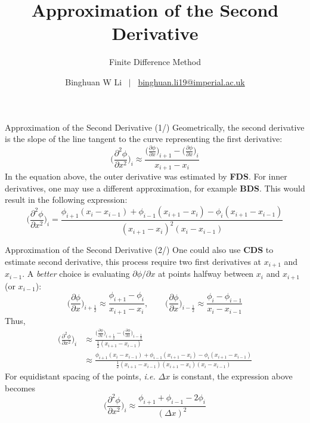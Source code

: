 \documentclass[10pt,aspectratio=169]{beamer}
\title{Approximation of the Second Derivative}
\subtitle{Finite Difference Method\cite{Ferziger2002}}
\author{Binghuan W Li \ $\lvert$ \   \href{mailto:binghuan.li19@imperial.ac.uk}{binghuan.li19@imperial.ac.uk}}
\institute{Department of Bioengineering, Imperial College London}
\begin{document}
\maketitle
\begin{frame}{Approximation of the Second Derivative (1/)}
    Geometrically, the second derivative is the slope of the line tangent to the curve representing the first derivative:
    \[
    \bigg( \frac{\partial^{2}\phi}{\partial x^{2}} \bigg)_{i} \approx
    \frac{\bigg( \frac{\partial \phi}{\partial x} \bigg)_{i+1} - \bigg( \frac{\partial \phi}{\partial x} \bigg)_{i}}{x_{i+1} - x_{i}}
    \]
    In the equation above, the outer derivative was estimated by \textbf{FDS}. For inner derivatives, one may use a different approximation, for example \textbf{BDS}. This would result in the following expression:
    \begin{equation} \label{eqn:taylor}
        \bigg( \frac{\partial^{2}\phi}{\partial x^{2}} \bigg)_{i} = 
        \frac{\phi_{i+1}(x_{i}-x_{i-1}) + \phi_{i-1}(x_{i+1}-x_{i})-\phi_{i}(x_{i+1}-x_{i-1})}{(x_{i+1}-x_{i})^{2} (x_{i}-x_{i-1})}  
    \end{equation}
\end{frame}
\begin{frame}{Approximation of the Second Derivative (2/)} \small
    One could also use \textbf{CDS} to estimate second derivative, this process require two first derivatives at $x_{i+1}$ and $x_{i-1}$. A \textit{better} choice is evaluating $\partial \phi/\partial x$ at points halfway between $x_{i}$ and $x_{i+1}$ (or $x_{i-1}$):
    \[
    \bigg( \frac{\partial\phi}{\partial x} \bigg)_{i+\frac{1}{2}} \approx \frac{\phi_{i+1}-\phi_{i}}{x_{i+1}-x_{i}}, 
    \quad \quad 
    \bigg( \frac{\partial\phi}{\partial x} \bigg)_{i-\frac{1}{2}} \approx \frac{\phi_{i}-\phi_{i-1}}{x_{i}-x_{i-1}}
    \]
    Thus, 
    \begin{align*}
       \bigg( \frac{\partial^{2}\phi}{\partial x^{2}} \bigg)_{i} & \approx 
       \frac{\bigg( \frac{\partial\phi}{\partial x} \bigg)_{i+\frac{1}{2}} - \bigg( \frac{\partial\phi}{\partial x} \bigg)_{i-\frac{1}{2}}}{\frac{1}{2}(x_{i+1}-x_{i-1})} \\
       & \approx \frac{\phi_{i+1}(x_{i}-x_{i-1}) + \phi_{i-1}(x_{i+1}-x_{i})-\phi_{i}(x_{i+1}-x_{i-1})}{\frac{1}{2}(x_{i+1}-x_{i-1}) (x_{i+1}-x_{i}) (x_{i}-x_{i-1})}
    \end{align*}
    For equidistant spacing of the points, \textit{i.e.} $\Delta x$ is constant, the expression above becomes 
    \[
    \bigg( \frac{\partial^{2}\phi}{\partial x^{2}} \bigg)_{i} \approx
    \frac{\phi_{i+1} + \phi_{i-1} -2\phi_{i}}{(\Delta x)^{2}}
    \]
\end{frame}
\end{document}
